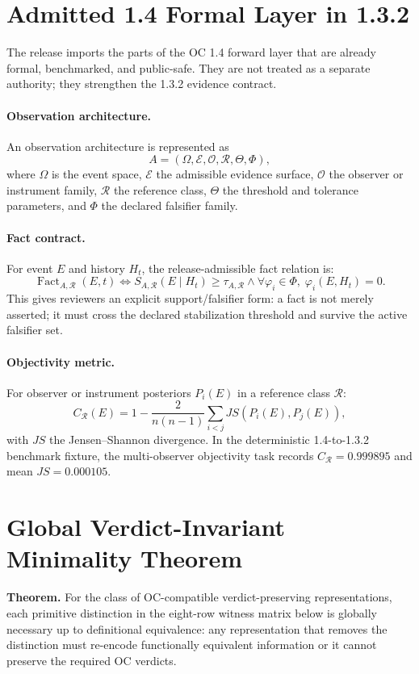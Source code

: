 \documentclass[11pt,a4paper]{article}
\begin{document}
\section*{Admitted 1.4 Formal Layer in 1.3.2}
The release imports the parts of the OC 1.4 forward layer that are already formal, benchmarked, and public-safe. They are not treated as a separate authority; they strengthen the 1.3.2 evidence contract.

\paragraph{Observation architecture.}
An observation architecture is represented as
\[
  A=(\Omega,\mathcal{E},\mathcal{O},\mathcal{R},\Theta,\Phi),
\]
where $\Omega$ is the event space, $\mathcal{E}$ the admissible evidence surface, $\mathcal{O}$ the observer or instrument family, $\mathcal{R}$ the reference class, $\Theta$ the threshold and tolerance parameters, and $\Phi$ the declared falsifier family.

\paragraph{Fact contract.}
For event $E$ and history $H_t$, the release-admissible fact relation is:
\[
  \operatorname{Fact}_{A,\mathcal{R}}(E,t)
  \Longleftrightarrow
  S_{A,\mathcal{R}}(E\mid H_t) \geq \tau_{A,\mathcal{R}}
  \land
  \forall \varphi_i \in \Phi,\; \varphi_i(E,H_t)=0.
\]
This gives reviewers an explicit support/falsifier form: a fact is not merely asserted; it must cross the declared stabilization threshold and survive the active falsifier set.

\paragraph{Objectivity metric.}
For observer or instrument posteriors $P_i(E)$ in a reference class $\mathcal{R}$:
\[
  C_{\mathcal{R}}(E)=1-\frac{2}{n(n-1)}\sum_{i<j}JS(P_i(E),P_j(E)),
\]
with $JS$ the Jensen--Shannon divergence. In the deterministic 1.4-to-1.3.2 benchmark fixture, the multi-observer objectivity task records $C_{\mathcal{R}}=0.999895$ and mean $JS=0.000105$.

\section*{Global Verdict-Invariant Minimality Theorem}
\textbf{Theorem.} For the class of OC-compatible verdict-preserving representations, each primitive distinction in the eight-row witness matrix below is globally necessary up to definitional equivalence: any representation that removes the distinction must re-encode functionally equivalent information or it cannot preserve the required OC verdicts.
\end{document}
